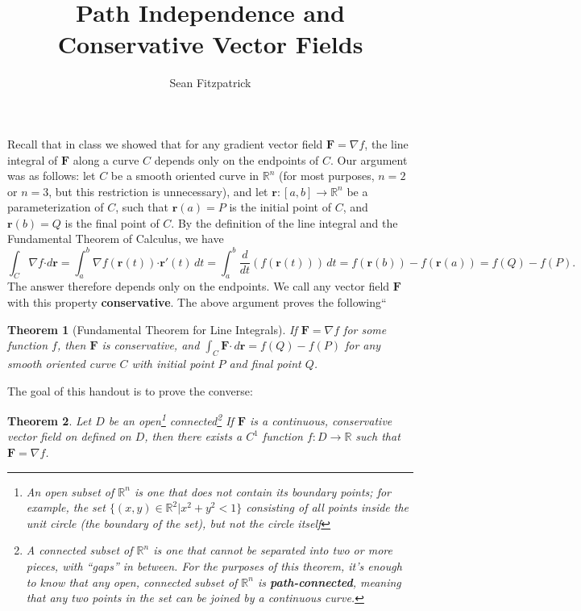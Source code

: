\documentclass[12pt,letterpaper]{article}
\author{Sean Fitzpatrick}
\title{Path Independence and Conservative Vector Fields}
\newtheorem{theorem}{Theorem}
\newcommand{\dotp}{\boldsymbol{\cdot}}
\newcommand{\R}{\mathbb{R}}
\renewcommand{\r}{\mathbf{r}}
\newcommand{\F}{\mathbf{F}}
\begin{document}
\maketitle

Recall that in class we showed that for any gradient vector field $\F = \nabla f$, the line integral of $\F$ along a curve $C$ depends only on the endpoints of $C$. Our argument was as follows: let $C$ be a smooth oriented curve in $\R^n$ (for most purposes, $n=2$ or $n=3$, but this restriction is unnecessary), and let $\r:[a,b]\to \R^n$ be a parameterization of $C$, such that $\r(a) = P$ is the initial point of $C$, and $\r(b)=Q$ is the final point of $C$. By the definition of the line integral and the Fundamental Theorem of Calculus, we have
\[
 \int_C \nabla f\dotp d\r = \int_a^b \nabla f(\r(t))\dotp \r'(t) \,dt = \int_a^b \frac{d}{dt}(f(\r(t)))\,dt = f(\r(b))-f(\r(a)) = f(Q)-f(P).
\]
The answer therefore depends only on the endpoints. We call any vector field $\F$ with this property \textbf{conservative}. The above argument proves the following``
\begin{theorem}[Fundamental Theorem for Line Integrals]\label{T1}
 If $\F = \nabla f$ for some function $f$, then $\F$ is conservative, and $\int_C \F\dotp\, d\r = f(Q)-f(P)$ for any smooth oriented curve $C$ with initial point $P$ and final point $Q$.
\end{theorem}
The goal of this handout is to prove the converse:
\begin{theorem}\label{T2}
 Let $D$ be an open\footnote{An open subset of $\R^n$ is one that does not contain its boundary points; for example, the set $\{(x,y)\in
\R^2 | x^2+y^2<1\}$ consisting of all points inside the unit circle (the boundary of the set), but not the circle itself} connected\footnote{A connected subset of $\R^n$ is one that cannot be separated into two or more pieces, with ``gaps'' in between. For the purposes of this theorem, it's enough to know that any open, connected subset of $\R^n$ is \textbf{path-connected}, meaning that any two points in the set can be joined by a continuous curve.} If $\F$ is a continuous, conservative vector field on defined on $D$, then there exists a $C^1$ function $f:D\to\R$ such that $\F = \nabla f$.
\end{theorem}
\end{document}
